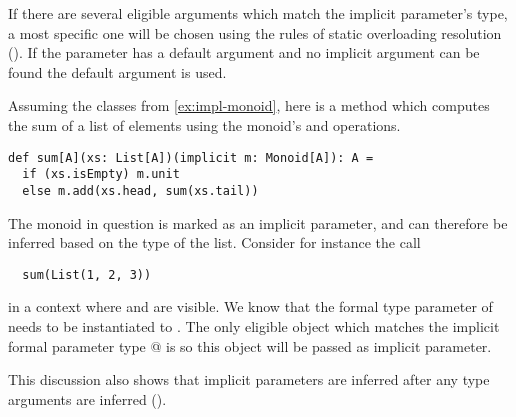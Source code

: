 If there are several eligible arguments which match the implicit
parameter's type, a most specific one will be chosen using the rules
of static overloading resolution ().
If the parameter has a default argument and no implicit argument can
be found the default argument is used.

\example Assuming the classes from \ref{ex:impl-monoid}, here is a 
method which computes the sum of a list of elements using the
monoid's  and  operations.
\begin{lstlisting}
def sum[A](xs: List[A])(implicit m: Monoid[A]): A = 
  if (xs.isEmpty) m.unit
  else m.add(xs.head, sum(xs.tail))
\end{lstlisting}
The monoid in question is marked as an implicit parameter, and can therefore
be inferred based on the type of the list.
Consider for instance the call 
\begin{lstlisting}
  sum(List(1, 2, 3))
\end{lstlisting}
in a context where \lstinline@stringMonoid@ and \lstinline@intMonoid@
are visible.  We know that the formal type parameter \lstinline@a@ of
\lstinline@sum@ needs to be instantiated to \lstinline@Int@. The only
eligible object which matches the implicit formal parameter type
\lstinline@Monoid[Int]@ is \lstinline@intMonoid@ so this object will
be passed as implicit parameter.\bigskip

This discussion also shows that implicit parameters are inferred after
any type arguments are inferred (). 


